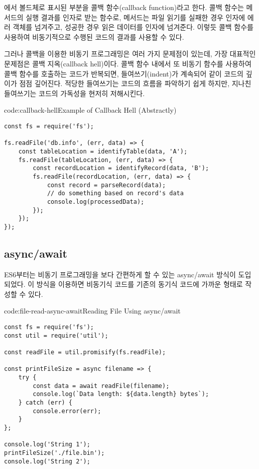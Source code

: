 에서 볼드체로 표시된 부분을 콜백 함수(callback function)라고 한다. 콜백 함수는 메서드의 실행 결과를 인자로 받는 함수로,  메서드는 파일 읽기를 실패한 경우  인자에 에러 객체를 넘겨주고, 성공한 경우 읽은 데이터를  인자에 넘겨준다. 이렇듯 콜백 함수를 사용하여 비동기적으로 수행된 코드의 결과를 사용할 수 있다.

그러나 콜백을 이용한 비동기 프로그래밍은 여러 가지 문제점이 있는데, 가장 대표적인 문제점은 콜백 지옥(callback hell)이다. 콜백 함수 내에서 또 비동기 함수를 사용하여 콜백 함수를 호출하는 코드가 반복되면, 들여쓰기(indent)가 계속되어 \과 같이 코드의 깊이가 점점 깊어진다. 적당한 들여쓰기는 코드의 흐름을 파악하기 쉽게 하지만, 지나친 들여쓰기는 코드의 가독성을 현저히 저해시킨다.

\begin{codeenv}{code:callback-hell}{Example of Callback Hell (Abstractly)}\begin{verbatim}
const fs = require('fs');

fs.readFile('db.info', (err, data) => {
    const tableLocation = identifyTable(data, 'A');
    fs.readFile(tableLocation, (err, data) => {
        const recordLocation = identifyRecord(data, 'B');
        fs.readFile(recordLocation, (err, data) => {
            const record = parseRecord(data);
            // do something based on record's data
            console.log(processedData);
        });
    });
});
\end{verbatim}
\end{codeenv}

\subsection*{async/await}

ES6부터는 비동기 프로그래밍을 보다 간편하게 할 수 있는 async/await 방식이 도입되었다. 이 방식을 이용하면 비동기식 코드를 기존의 동기식 코드에 가까운 형태로 작성할 수 있다.

\begin{codeenv}{code:file-read-async-await}{Reading File Using async/await}\begin{verbatim}
const fs = require('fs');
const util = require('util');

const readFile = util.promisify(fs.readFile);

const printFileSize = async filename => {
    try {
        const data = await readFile(filename);
        console.log(`Data length: ${data.length} bytes`);
    } catch (err) {
        console.error(err);
    }
};

console.log('String 1');
printFileSize('./file.bin');
console.log('String 2');
\end{verbatim}
\end{codeenv}

